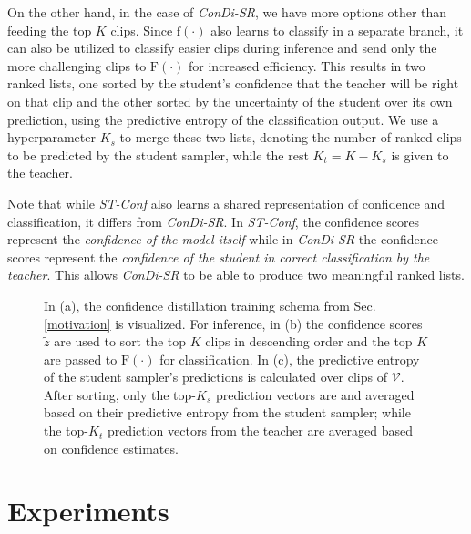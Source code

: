 \documentclass[a4paper,conference]{IEEEtran}
\begin{document}
On the other hand, in the case of \textit{ConDi-SR}, we have more options other than feeding the top $K$ clips. Since $\mathrm{f}(\cdot)$ also learns to classify in a separate branch, it can also be utilized to classify easier clips during inference and send only the more challenging clips to $\mathrm{F}(\cdot)$ for increased efficiency. This results in two ranked lists, one sorted by the student's confidence that the teacher will be right on that clip and the other sorted by the uncertainty of the student over its own prediction, using the predictive entropy of the classification output. We use a hyperparameter $K_s$ to merge these two lists, denoting the number of ranked clips to be predicted by the student sampler, while the rest $K_t = K - K_s$ is given to the teacher.  

Note that while \textit{ST-Conf} also learns a shared representation of confidence and classification, it differs from \textit{ConDi-SR}. In \textit{ST-Conf}, the confidence scores represent the \textit{confidence of the model itself} while in \textit{ConDi-SR} the confidence scores represent the \textit{confidence of the student in correct classification by the teacher}. This allows \textit{ConDi-SR} to be able to produce two meaningful ranked lists. 

\begin{figure*} \centering
    \quad
    \vrule
    \quad
    \qquad
    \caption{In (a), the confidence distillation training schema from Sec. \ref{motivation} is visualized. For inference, in (b) the confidence scores $\tilde{z}$ are used to sort the top $K$ clips in descending order and the top $K$ are passed to $\mathrm{F}(\cdot)$ for classification. In (c), the predictive entropy of the student sampler's predictions is calculated over clips of $\mathcal{V}$. After sorting, only the top-$K_s$ prediction vectors are and averaged based on their predictive entropy from the student sampler; while the top-$K_t$ prediction vectors from the teacher are averaged based on confidence estimates.}\label{fig:inference}
\end{figure*}


\section{Experiments}
\end{document}
